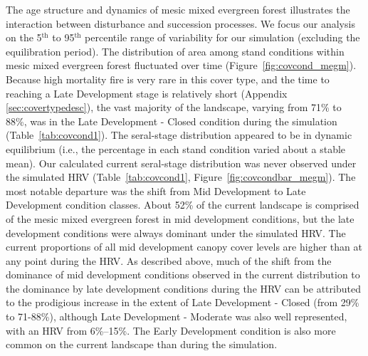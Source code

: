 The age structure and dynamics of mesic mixed evergreen forest illustrates the interaction between disturbance and succession processes. We focus our analysis on the 5$^{\text{th}}$ to 95$^{\text{th}}$ percentile range of variability for our simulation (excluding the equilibration period). %
%
The distribution of area among stand conditions within mesic mixed evergreen forest fluctuated over time (Figure~\ref{fig:covcond_megm}). Because high mortality fire is very rare in this cover type, and the time to reaching a Late Development stage is relatively short (Appendix \ref{sec:covertypedesc}), the vast majority of the landscape, varying from 71\% to 88\%, was in the Late Development - Closed condition during the simulation (Table~\ref{tab:covcond1}). %
%
The seral-stage distribution appeared to be in dynamic equilibrium (i.e., the percentage in each stand condition varied about a stable mean). Our calculated current seral-stage distribution was never observed under the simulated HRV (Table~\ref{tab:covcond1}, Figure~\ref{fig:covcondbar_megm}). The most notable departure was the shift from Mid Development to Late Development condition classes. About 52\% of the current landscape is comprised of the mesic mixed evergreen forest in mid development conditions, but the late development conditions were always dominant under the simulated HRV. The current proportions of all mid development canopy cover levels are higher than at any point during the HRV. As described above, much of the shift from the dominance of mid development conditions observed in the current distribution to the dominance by late development conditions during the HRV can be attributed to the prodigious increase in the extent of Late Development - Closed (from 29\% to 71-88\%), although Late Development - Moderate was also well represented, with an HRV from 6\%--15\%. The Early Development condition is also more common on the current landscape than during the simulation.


